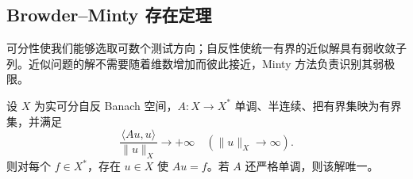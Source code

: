 \subsection{Browder–Minty 存在定理}
\label{b2:subsec:H20403}

可分性使我们能够选取可数个测试方向；自反性使统一有界的近似解具有弱收敛子列。近似问题的解不需要随着维数增加而彼此接近，Minty 方法负责识别其弱极限。

\begin{theorem}\label{b2:thm:H4-browder-minty}
设 \(X\) 为实可分自反 Banach 空间，\(A:X\to X^*\) 单调、半连续、把有界集映为有界集，并满足
\[
 \frac{\langle Au,u\rangle}{\|u\|_X}
       \longrightarrow+\infty\quad(\|u\|_X\to\infty).
\]
则对每个 \(f\in X^*\)，存在 \(u\in X\) 使 \(Au=f\)。若 \(A\) 还严格单调，则该解唯一。
\end{theorem}
